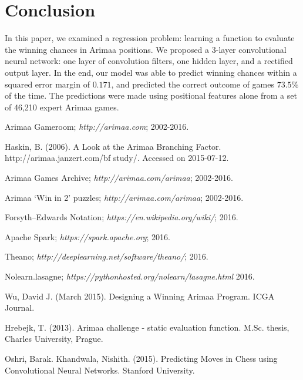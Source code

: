 \documentclass{article}
\begin{document}
\section{Conclusion}

In this paper, we examined a regression problem: learning a function to evaluate the winning chances in Arimaa positions.  We proposed a 3-layer convolutional neural network: one layer of convolution filters, one hidden layer, and a rectified output layer.  In the end, our model was able to predict winning chances within a squared error margin of $0.171$, and predicted the correct outcome of games $73.5\%$ of the time.  The predictions were made using positional features alone from a set of 46,210 expert Arimaa games.

\begin{thebibliography}{9}

Arimaa Gameroom;
\textit{http://arimaa.com};
2002-2016.

Haskin, B. (2006). A Look at the Arimaa Branching Factor. http://arimaa.janzert.com/bf study/. Accessed on 2015-07-12.

Arimaa Games Archive;
\textit{http://arimaa.com/arimaa};
2002-2016.

Arimaa `Win in 2' puzzles;
\textit{http://arimaa.com/arimaa};
2002-2016.

Forsyth--Edwards Notation;
\textit{https://en.wikipedia.org/wiki/};
2016.

Apache Spark;
\textit{https://spark.apache.org};
2016.

Theano;
\textit{http://deeplearning.net/software/theano/};
2016.

Nolearn.lasagne;
\textit{https://pythonhosted.org/nolearn/lasagne.html}
2016.

Wu, David J. (March 2015).
Designing a Winning Arimaa Program.
ICGA Journal.

Hrebejk, T. (2013). Arimaa challenge - static evaluation function. M.Sc. thesis, Charles University, Prague.

Oshri, Barak. Khandwala, Nishith. (2015).  Predicting Moves in Chess using Convolutional Neural Networks.  Stanford University.

\end{thebibliography}
\end{document}
